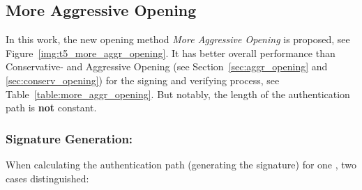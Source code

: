 \subsection{More Aggressive Opening}
\label{sec:more_aggr_opening}
In this work, the new opening method \textit{More Aggressive Opening} is proposed, see Figure~\ref{img:t5_more_aggr_opening}. It has better overall performance than Conservative- and Aggressive Opening (see Section~\ref{sec:aggr_opening} and \ref{sec:conserv_opening}) for the signing and verifying process, see Table~\ref{table:more_aggr_opening}. But notably, the length of the authentication path is \textbf{not} constant.

\subsubsection{Signature Generation: \texorpdfstring{\tfblock}{T5-Block}}
When calculating the authentication path (generating the signature) for one \tfblock, two cases distinguished:

